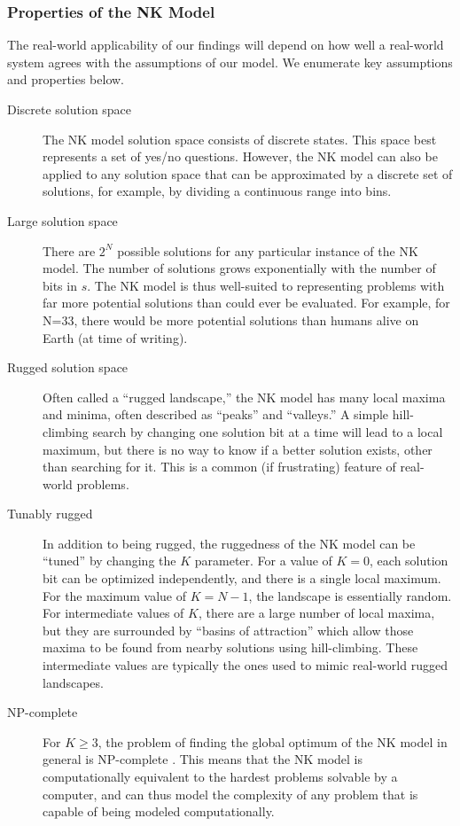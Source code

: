\documentclass[manuscript,screen,review,acmsmall]{acmart}
\begin{document}
\subsubsection{Properties of the NK Model}
The real-world applicability of our findings will depend on how well a real-world system agrees with the assumptions of our model.
We enumerate key assumptions and properties below.
\begin{description}
\item[Discrete solution space]
The NK model solution space consists of discrete states.
This space best represents a set of yes/no questions.
However, the NK model can also be applied to any solution space that can be approximated by a discrete set of solutions, for example, by dividing a continuous range into bins.
\item[Large solution space]
There are $2^N$ possible solutions for any particular instance of the NK model.
The number of solutions grows exponentially with the number of bits in $s$.
The NK model is thus well-suited to representing problems with far more potential solutions than could ever be evaluated.
For example, for N=33, there would be more potential solutions than humans alive on Earth (at time of writing).
\item[Rugged solution space]
Often called a ``rugged landscape,'' the NK model has many local maxima and minima,
often described as ``peaks'' and ``valleys.''
A simple hill-climbing search by changing one solution bit at a time will lead to a local maximum,
but there is no way to know if a better solution exists, other than searching for it.
This is a common (if frustrating) feature of real-world problems.
\item[Tunably rugged]
In addition to being rugged, the ruggedness of the NK model can be ``tuned'' by changing the $K$ parameter.
For a value of $K=0$, each solution bit can be optimized independently, and there is a single local maximum.
For the maximum value of $K=N-1$,
the landscape is essentially random.
For intermediate values of $K$,
there are a large number of local maxima, but they are surrounded by ``basins of attraction'' which allow those maxima to be found from nearby solutions using hill-climbing.
These intermediate values are typically the ones used to mimic real-world rugged landscapes.
\item[NP-complete]
For $K \geq 3$, the problem of finding the global optimum of the NK model in general is NP-complete \cite{weinberger_np_1996}.
This means that the NK model is computationally equivalent to the hardest problems solvable by a computer,
and can thus model the complexity of any problem that is capable of being modeled computationally.
\end{description}
\end{document}
